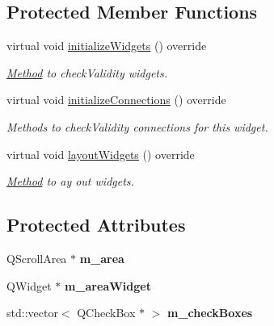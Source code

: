 \subsection*{Protected Member Functions}
\begin{DoxyCompactItemize}
\item 
\mbox{\label{classrev_1_1_view_1_1_billboard_flags_widget_a6580f152dd499507c2c0a5752f618693}} 
virtual void \mbox{\hyperlink{classrev_1_1_view_1_1_billboard_flags_widget_a6580f152dd499507c2c0a5752f618693}{initialize\+Widgets}} () override
\begin{DoxyCompactList}\small\item\em \mbox{\hyperlink{struct_method}{Method}} to check\+Validity widgets. \end{DoxyCompactList}\item 
\mbox{\label{classrev_1_1_view_1_1_billboard_flags_widget_ad2a0b7e19ee48d5a7a8ffc878bfba5f0}} 
virtual void \mbox{\hyperlink{classrev_1_1_view_1_1_billboard_flags_widget_ad2a0b7e19ee48d5a7a8ffc878bfba5f0}{initialize\+Connections}} () override
\begin{DoxyCompactList}\small\item\em Methods to check\+Validity connections for this widget. \end{DoxyCompactList}\item 
\mbox{\label{classrev_1_1_view_1_1_billboard_flags_widget_a78c740fb11958b05b58fa412b89de215}} 
virtual void \mbox{\hyperlink{classrev_1_1_view_1_1_billboard_flags_widget_a78c740fb11958b05b58fa412b89de215}{layout\+Widgets}} () override
\begin{DoxyCompactList}\small\item\em \mbox{\hyperlink{struct_method}{Method}} to ay out widgets. \end{DoxyCompactList}\end{DoxyCompactItemize}
\subsection*{Protected Attributes}
\begin{DoxyCompactItemize}
\item 
\mbox{\label{classrev_1_1_view_1_1_billboard_flags_widget_af38f5c4fdca60f6abae673fae07cc1b1}} 
Q\+Scroll\+Area $\ast$ {\bfseries m\+\_\+area}
\item 
\mbox{\label{classrev_1_1_view_1_1_billboard_flags_widget_a3b5a56a62e890be9ffcad51a0897331a}} 
Q\+Widget $\ast$ {\bfseries m\+\_\+area\+Widget}
\item 
\mbox{\label{classrev_1_1_view_1_1_billboard_flags_widget_ac9d535799f094def588a55ba630fd31b}} 
std\+::vector$<$ Q\+Check\+Box $\ast$ $>$ {\bfseries m\+\_\+check\+Boxes}
\end{DoxyCompactItemize}
